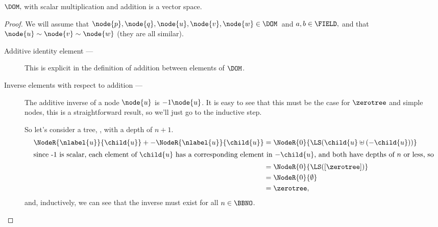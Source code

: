 \begin{proposition}\label{vspace} $\DOM,$ with scalar multiplication and addition is a vector space.
  \begin{proof}
    We will assume that  $\node{p}, \node{q}, \node{u},\node{v},\node{w} \in \DOM$\ and $a, b \in  \FIELD,$ and that
    $\node{u} \sim \node{v} \sim \node{w}$ (they are all similar).

    \begin{description} 
    \item[Additive identity element --- ]

      This is explicit in the definition of addition between elements
      of $\DOM$.

    \item[Inverse elements with respect to addition --- ]

      The additive inverse of a node $\node{u}$ is $-1\node{u}$. It is easy to see that
      this must be the case for $\zerotree$ and simple nodes, this is a
      straightforward result, so we'll just go to the inductive step.

      \goodbreak
      So let's consider a tree, , with a depth of $n+1$.
      \begin{align*}
        \NodeR{\nlabel{u}}{\child{u}} + -\NodeR{\nlabel{u}}{\child{u}}&=\NodeR{0}{\LS(\child{u}\uplus(-\child{u}))}\\
        \intertext{since -1 is scalar, each element of $\child{u}$ has a corresponding
          element in $-\child{u}$, and both have depths of $n$ or less, so}
        &= \NodeR{0}{\LS([\zerotree])}\\
        &=\NodeR{0}{\emptyset} \\
        &= \zerotree,
      \end{align*}
      and, inductively, we can see that the inverse must exist for all $n\in\BBNO$.




\end{description}
\end{proof}
\end{proposition}
